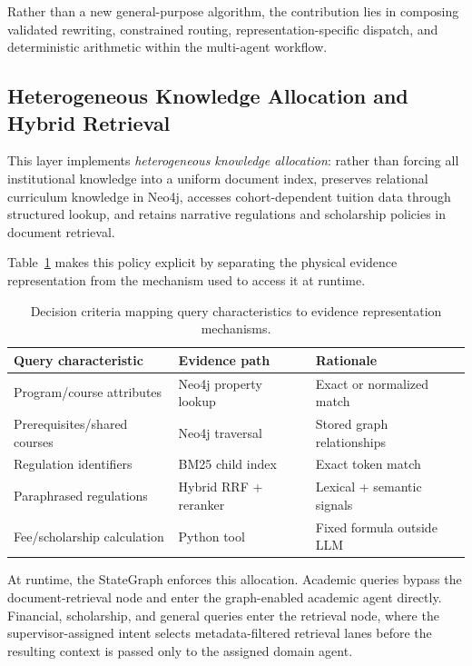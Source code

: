 Rather than a new general-purpose algorithm, the contribution lies in composing validated rewriting, constrained routing, representation-specific dispatch, and deterministic arithmetic within the multi-agent workflow.

\subsection{Heterogeneous Knowledge Allocation and Hybrid Retrieval}
\label{sec:hybrid_retrieval}

This layer implements \emph{heterogeneous knowledge allocation}: rather than forcing all institutional knowledge into a uniform document index, \system{} preserves relational curriculum knowledge in Neo4j, accesses cohort-dependent tuition data through structured lookup, and retains narrative regulations and scholarship policies in document retrieval.

Table~\ref{tab:decision_criteria} makes this policy explicit by separating the physical evidence representation from the mechanism used to access it at runtime.

\begin{table}[h!]
\centering
\caption{Decision criteria mapping query characteristics to evidence representation mechanisms.}
\label{tab:decision_criteria}
\setlength{\tabcolsep}{3pt}
\renewcommand{\arraystretch}{1.1}
\begin{tabular}{>{\raggedright\arraybackslash}p{}>{\raggedright\arraybackslash}p{}>{\raggedright\arraybackslash}p{}}
\toprule
\textbf{Query characteristic} & \textbf{Evidence path} & \textbf{Rationale} \\
\midrule
Program/course attributes & Neo4j property lookup & Exact or normalized match \\
Prerequisites/shared courses & Neo4j traversal & Stored graph relationships \\
Regulation identifiers & BM25 child index & Exact token match \\
Paraphrased regulations & Hybrid RRF + reranker & Lexical + semantic signals \\
Fee/scholarship calculation & Python tool & Fixed formula outside LLM \\
\bottomrule
\end{tabular}
\end{table}

At runtime, the StateGraph enforces this allocation. Academic queries bypass the document-retrieval node and enter the graph-enabled academic agent directly. Financial, scholarship, and general queries enter the retrieval node, where the supervisor-assigned intent selects metadata-filtered retrieval lanes before the resulting context is passed only to the assigned domain agent.


